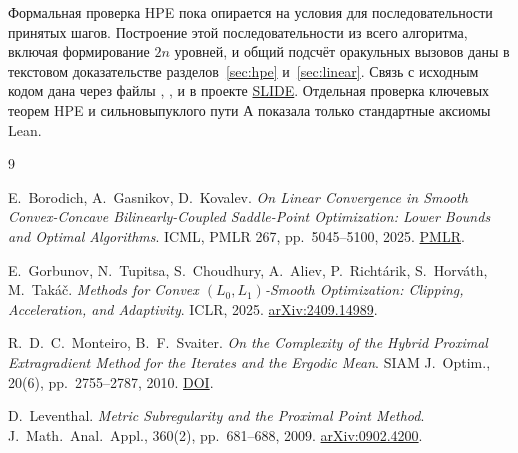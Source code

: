 \documentclass[12pt,a4paper]{article}
\begin{document}
Формальная проверка HPE пока опирается на условия для последовательности
принятых шагов. Построение этой последовательности из всего алгоритма,
включая формирование $2n$ уровней, и общий подсчёт оракульных вызовов
даны в текстовом доказательстве разделов~\ref{sec:hpe} и~\ref{sec:linear}.
Связь с исходным кодом дана через файлы ,
,  и
 в проекте
\href{https://github.com/xangsten/SLIDE}{SLIDE}. Отдельная проверка
ключевых теорем HPE и сильновыпуклого пути А показала только стандартные
аксиомы Lean.

\begin{thebibliography}{9}
\raggedright
{}
E.~Borodich, A.~Gasnikov, D.~Kovalev.
\textit{On Linear Convergence in Smooth Convex-Concave Bilinearly-Coupled
Saddle-Point Optimization: Lower Bounds and Optimal Algorithms}.
ICML, PMLR 267, pp.~5045--5100, 2025.
\href{https://proceedings.mlr.press/v267/borodich25a.html}{PMLR}.

E.~Gorbunov, N.~Tupitsa, S.~Choudhury, A.~Aliev, P.~Richtárik,
S.~Horváth, M.~Takáč.
\textit{Methods for Convex \texorpdfstring{$(L_0,L_1)$}{(L0,L1)}-Smooth
Optimization: Clipping, Acceleration, and Adaptivity}.
ICLR, 2025.
\href{https://arxiv.org/abs/2409.14989}{arXiv:2409.14989}.

R.~D.~C.~Monteiro, B.~F.~Svaiter.
\textit{On the Complexity of the Hybrid Proximal Extragradient Method
for the Iterates and the Ergodic Mean}.
SIAM J.~Optim., 20(6), pp.~2755--2787, 2010.
\href{https://doi.org/10.1137/090753127}{DOI}.

D.~Leventhal.
\textit{Metric Subregularity and the Proximal Point Method}.
J.~Math.~Anal.~Appl., 360(2), pp.~681--688, 2009.
\href{https://arxiv.org/abs/0902.4200}{arXiv:0902.4200}.
\end{thebibliography}
\end{document}
